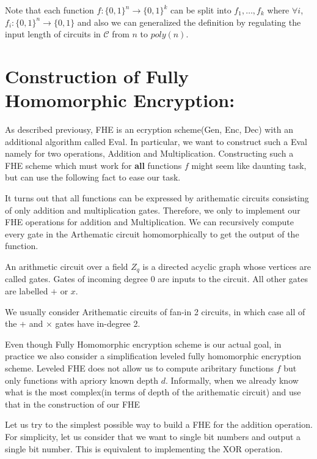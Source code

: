 \documentclass[usletter]{article}
\begin{document}
Note that each function $f:\{0,1\}^n\rightarrow\{0,1\}^k$ can be split into $f_1,\dots,f_k$ where $\forall i$, $f_i:\{0,1\}^n\rightarrow\{0,1\}$ and also we can generalized the definition by regulating the input length of circuits in $\mathcal{C}$ from $n$ to $poly(n)$.

\section{Construction of Fully Homomorphic Encryption:}
As described previousy, FHE is an ecryption scheme(Gen, Enc, Dec) 
with an additional algorithm called Eval. In particular, we want to construct 
such a Eval namely for two operations, Addition and Multiplication. Constructing 
such a FHE scheme which must work for \textbf{all} functions $f$ might seem like daunting task, 
but can use the following fact to ease our task.
\begin{fact}
It turns out that all functions can be expressed by arithematic circuits consisting
of only addition and multiplication gates. Therefore, we only to implement our FHE operations for 
addition and Multiplication. We can recursively compute every gate  in the Arthematic circuit 
homomorphically to get the output of the function. 
\end{fact}

\begin{definition}
An arithmetic circuit over a field $Z_q$ is a directed
acyclic graph whose vertices are called gates. Gates of incoming degree 0 are inputs to
the circuit. All other gates are labelled $+$ or $x$. 
\end{definition}
We usually consider Arithematic circuits of fan-in 2 circuits, in which 
case all of the + and × gates have in-degree 2.

\begin{remark}
Even though Fully Homomorphic encryption scheme is our actual goal, in practice we also consider 
a simplification leveled fully homomorphic encryption scheme. Leveled FHE does not allow us to 
compute aribritary functions $f$ but only functions with apriory known depth $d$. Informally, when 
we already know what is the most complex(in terms of depth of the arithematic circuit) and use that 
in the construction of our FHE
\end{remark}

Let us try to the simplest possible way to build a FHE for the addition operation. 
For simplicity, let us consider that we want to single bit numbers 
and output a single bit number. This is equivalent to implementing the XOR operation. 
\end{document}
